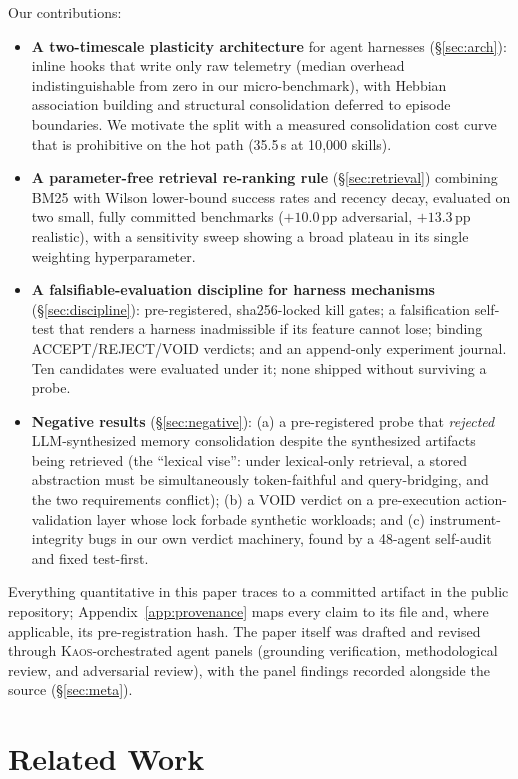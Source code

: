 \documentclass[11pt]{article}
\newcommand{\kaos}{\textsc{Kaos}}
\begin{document}
Our contributions:
\begin{itemize}
  \item \textbf{A two-timescale plasticity architecture} for agent harnesses (\S\ref{sec:arch}): inline hooks that write only raw telemetry (median overhead indistinguishable from zero in our micro-benchmark), with Hebbian association building and structural consolidation deferred to episode boundaries. We motivate the split with a measured consolidation cost curve that is prohibitive on the hot path (35.5\,s at 10{,}000 skills).
  \item \textbf{A parameter-free retrieval re-ranking rule} (\S\ref{sec:retrieval}) combining BM25 with Wilson lower-bound success rates and recency decay, evaluated on two small, fully committed benchmarks ($+10.0$\,pp adversarial, $+13.3$\,pp realistic), with a sensitivity sweep showing a broad plateau in its single weighting hyperparameter.
  \item \textbf{A falsifiable-evaluation discipline for harness mechanisms} (\S\ref{sec:discipline}): pre-registered, sha256-locked kill gates; a falsification self-test that renders a harness inadmissible if its feature cannot lose; binding ACCEPT/REJECT/VOID verdicts; and an append-only experiment journal. Ten candidates were evaluated under it; none shipped without surviving a probe.
  \item \textbf{Negative results} (\S\ref{sec:negative}): (a) a pre-registered probe that \emph{rejected} LLM-synthesized memory consolidation despite the synthesized artifacts being retrieved (the ``lexical vise'': under lexical-only retrieval, a stored abstraction must be simultaneously token-faithful and query-bridging, and the two requirements conflict); (b) a VOID verdict on a pre-execution action-validation layer whose lock forbade synthetic workloads; and (c) instrument-integrity bugs in our own verdict machinery, found by a 48-agent self-audit and fixed test-first.
\end{itemize}

Everything quantitative in this paper traces to a committed artifact in the public repository; Appendix~\ref{app:provenance} maps every claim to its file and, where applicable, its pre-registration hash. The paper itself was drafted and revised through \kaos{}-orchestrated agent panels (grounding verification, methodological review, and adversarial review), with the panel findings recorded alongside the source (\S\ref{sec:meta}).

\section{Related Work}
\end{document}
